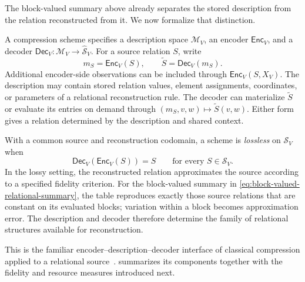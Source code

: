 The block-valued summary above already separates the stored description from the relation reconstructed from it.
We now formalize that distinction.

A compression scheme specifies a description space $\mathcal M_V$, an encoder $\mathsf{Enc}_V$, and a decoder $\mathsf{Dec}_V:\mathcal M_V\to\widehat{\mathcal S}_V$.
For a source relation $S$, write
\begin{equation}
m_S=\mathsf{Enc}_V(S),
\qquad
\widetilde S=\mathsf{Dec}_V(m_S).
\label{eq:relational-reconstruction-interface}
\end{equation}
Additional encoder-side observations can be included through $\mathsf{Enc}_V(S,X_V)$.
The description may contain stored relation values, element assignments, coordinates, or parameters of a relational reconstruction rule.
The decoder can materialize $\widetilde S$ or evaluate its entries on demand through $(m_S,v,w)\mapsto\widetilde S(v,w)$.
Either form gives a relation determined by the description and shared context.

With a common source and reconstruction codomain, a scheme is \emph{lossless} on $\mathcal S_V$ when
\begin{equation}
\mathsf{Dec}_V(\mathsf{Enc}_V(S))=S
\qquad
\text{for every }S\in\mathcal S_V.
\label{eq:lossless-relational-compression}
\end{equation}
In the lossy setting, the reconstructed relation approximates the source according to a specified fidelity criterion.
For the block-valued summary in \cref{eq:block-valued-relational-summary}, the table reproduces exactly those source relations that are constant on its evaluated blocks; variation within a block becomes approximation error.
The description and decoder therefore determine the family of relational structures available for reconstruction.

This is the familiar encoder--description--decoder interface of classical compression applied to a relational source~\citep{cover2006elements}.
 summarizes its components together with the fidelity and resource measures introduced next.

